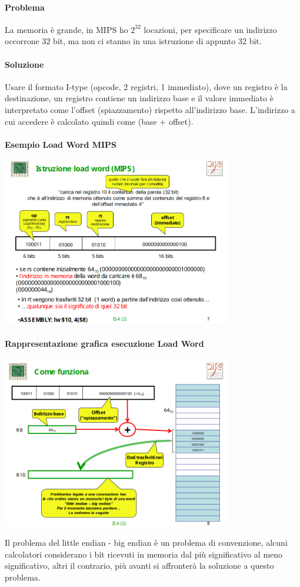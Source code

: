 \documentclass[12pt, a4paper, openany]{book}
\begin{document}
\paragraph{Problema} La memoria è grande, in MIPS ho $2^{32}$ locazioni, 
per specificare un indirizzo occorrone 32 bit, ma non ci stanno in una istruzione di appunto
32 bit. 
\paragraph*{Soluzione} Usare il formato I-type (opcode, 2 registri, 1 immediato), dove un
registro è la destinazione, un registro contiene un indirizzo base e il valore immediato
è interpretato come l'offset (spiazzamento) rispetto all'indirizzo base.
L'indirizzo a cui accedere è calcolato quindi come (base + offset).
\paragraph*{Esempio Load Word MIPS}
\begin{center}
    \includegraphics[width=100mm, scale=0.5]{load and store.png}
\end{center}
\paragraph*{Rappresentazione grafica esecuzione Load Word}
\begin{center}
    \includegraphics[width=100mm, scale=0.5]{funzionamento ld.png}
\end{center}
Il problema del little endian - big endian è un problema di convenzione,
alcuni calcolatori considerano i bit ricevuti in memoria dal più significativo
al meno significativo, altri il contrario, più avanti si affronterà la soluzione
a questo problema.
\end{document}
